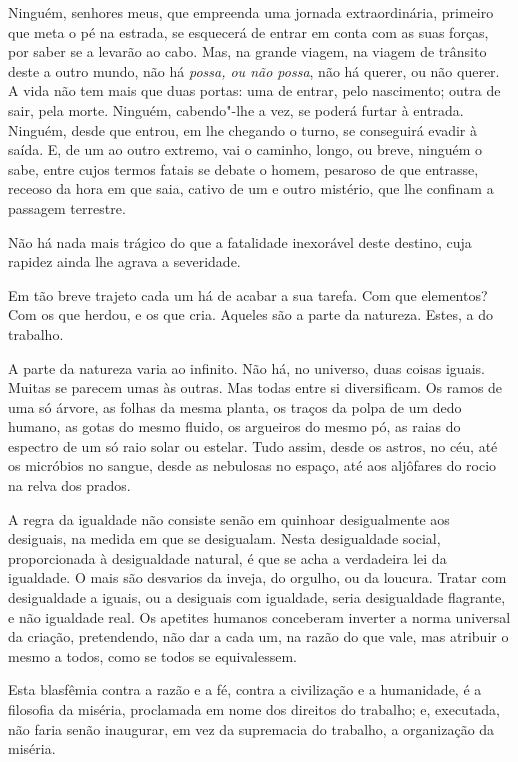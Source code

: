Ninguém, senhores meus, que empreenda uma jornada extraordinária,
primeiro que meta o pé na estrada, se esquecerá de entrar em conta com
as suas forças, por saber se a levarão ao cabo. Mas, na grande viagem,
na viagem de trânsito deste a outro mundo, não há \textit{possa, ou não
possa}, não há querer, ou não querer. A vida não tem mais que duas
portas: uma de entrar, pelo nascimento; outra de sair, pela morte.
Ninguém, cabendo"-lhe a vez, se poderá furtar à entrada. Ninguém, desde
que entrou, em lhe chegando o turno, se conseguirá evadir à saída. E,
de um ao outro extremo, vai o caminho, longo, ou breve, ninguém o sabe,
entre cujos termos fatais se debate o homem, pesaroso de que entrasse,
receoso da hora em que saia, cativo de um e outro mistério, que lhe
confinam a passagem terrestre.

Não há nada mais trágico do que a fatalidade inexorável deste
destino, cuja rapidez ainda lhe agrava a severidade.

Em tão breve trajeto cada um há de acabar a sua tarefa. Com que
elementos? Com os que herdou, e os que cria. Aqueles são a parte da
natureza. Estes, a do trabalho.

A parte da natureza varia ao infinito. Não há, no universo, duas
coisas iguais. Muitas se parecem umas às outras. Mas todas entre si
diversificam. Os ramos de uma só árvore, as folhas da mesma planta, os
traços da polpa de um dedo humano, as gotas do mesmo fluido, os
argueiros do mesmo pó, as raias do espectro de um só raio solar ou
estelar. Tudo assim, desde os astros, no céu, até os micróbios no
sangue, desde as nebulosas no espaço, até aos aljôfares do rocio na
relva dos prados.

A regra da igualdade não consiste senão em quinhoar desigualmente
aos desiguais, na medida em que se desigualam. Nesta desigualdade
social, proporcionada à desigualdade natural, é que se acha a
verdadeira lei da igualdade. O mais são desvarios da inveja, do
orgulho, ou da loucura. Tratar com desigualdade a iguais, ou a
desiguais com igualdade, seria desigualdade flagrante, e não igualdade
real. Os apetites humanos conceberam inverter a norma universal da
criação, pretendendo, não dar a cada um, na razão do que vale, mas
atribuir o mesmo a todos, como se todos se equivalessem.

Esta blasfêmia contra a razão e a fé, contra a civilização e a
humanidade, é a filosofia da miséria, proclamada em nome dos direitos
do trabalho; e, executada, não faria senão inaugurar, em vez da
supremacia do trabalho, a organização da miséria.

